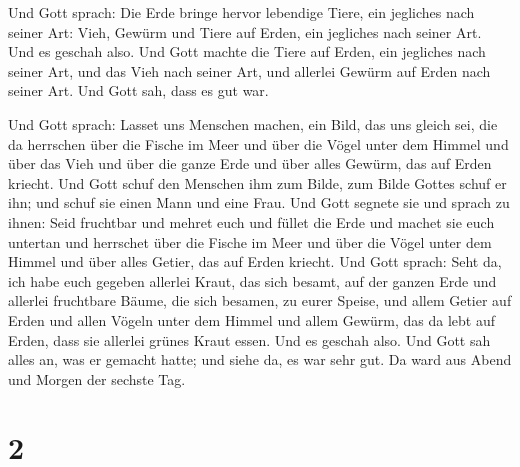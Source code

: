  Und Gott sprach: Die Erde bringe hervor lebendige Tiere,
ein jegliches nach seiner Art: Vieh, Gewürm und Tiere auf Erden, ein
jegliches nach seiner Art. Und es geschah also.  Und Gott
machte die Tiere auf Erden, ein jegliches nach seiner Art, und das Vieh
nach seiner Art, und allerlei Gewürm auf Erden nach seiner Art. Und Gott
sah, dass es gut war.

 Und Gott sprach: Lasset uns Menschen machen, ein Bild,
das uns gleich sei, die da herrschen über die Fische im Meer und über
die Vögel unter dem Himmel und über das Vieh und über die ganze Erde und
über alles Gewürm, das auf Erden kriecht.  Und Gott schuf
den Menschen ihm zum Bilde, zum Bilde Gottes schuf er ihn; und schuf sie
einen Mann und eine Frau.  Und Gott segnete sie und
sprach zu ihnen: Seid fruchtbar und mehret euch und füllet die Erde und
machet sie euch untertan und herrschet über die Fische im Meer und über
die Vögel unter dem Himmel und über alles Getier, das auf Erden kriecht.
 Und Gott sprach: Seht da, ich habe euch gegeben allerlei
Kraut, das sich besamt, auf der ganzen Erde und allerlei fruchtbare
Bäume, die sich besamen, zu eurer Speise,  und allem
Getier auf Erden und allen Vögeln unter dem Himmel und allem Gewürm, das
da lebt auf Erden, dass sie allerlei grünes Kraut essen. Und es geschah
also.  Und Gott sah alles an, was er gemacht hatte; und
siehe da, es war sehr gut. Da ward aus Abend und Morgen der sechste Tag.

\hypertarget{section-1}{%
\section{2}\label{section-1}}

